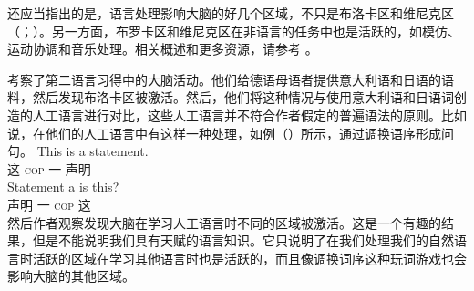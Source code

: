 还应当指出的是，语言处理影响大脑的好几个区域，不只是布洛卡区和维尼克区（\citealp[]{FM2005a}；\citealp{Friederici2009a}）。另一方面，布罗卡区和维尼克区在非语言的任务中也是活跃的，如模仿、运动协调和音乐处理\citep{MKGF2001a}。相关概述和更多资源，请参考 。

 \citet{MMGRRBW2003a}考察了第二语言习得中的大脑活动。他们给德语母语者提供意大利语和日语的语料，然后发现布洛卡区被激活。然后，他们将这种情况与使用意大利语和日语词创造的人工语言进行对比，这些人工语言并不符合作者假定的普遍语法的原则。比如说，在他们的人工语言中有这样一种处理，如例（）所示，通过调换语序形成问句。
\eal
\ex 
\gll This is a statement.\\
这 \textsc{cop} 一 声明\\
\ex 
\gll Statement a is this?\\
     声明 一 \textsc{cop} 这\\
\zl
然后作者观察发现大脑在学习人工语言时不同的区域被激活。这是一个有趣的结果，但是不能说明我们具有天赋的语言知识。它只说明了在我们处理我们的自然语言时活跃的区域在学习其他语言时也是活跃的，而且像调换词序这种玩词游戏也会影响大脑的其他区域。

